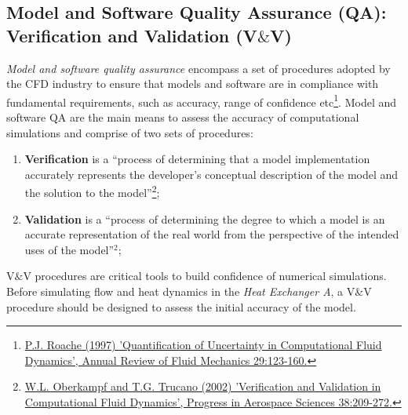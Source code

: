 \documentclass[12pts,a4paper,amsmath,amssymb,floatfix]{article}%
\newcommand{\vv}{V$\&$V }
\begin{document}
     \subsection{Model and Software Quality Assurance (QA): Verification and Validation (V$\&$V)}
                {\it Model and software quality assurance} encompass a set of procedures adopted by the CFD industry to ensure that models and software are in compliance with fundamental requirements, such as accuracy, range of confidence etc\footnote{\href{https://doi.org/10.1146/annurev.fluid.29.1.123}{P.J. Roache (1997) 'Quantification of Uncertainty in Computational Fluid Dynamics', Annual Review of Fluid Mechanics 29:123-160.}}. Model and software QA are the main means to assess the accuracy of computational simulations and comprise of two sets of procedures:
                \begin{enumerate}
                \item {\bf Verification} is a ``process of determining that a model implementation accurately represents the developer's conceptual description of the
model and the solution to the model''\footnote{\href{https://doi.org/10.1016/S0376-0421(02)00005-2}{W.L. Oberkampf and T.G. Trucano (2002) 'Verification and Validation in Computational Fluid Dynamics', Progress in Aerospace Sciences 38:209-272.}};
                   \item {\bf Validation} is a ``process of determining the degree to which a model is an accurate representation of the real world from the perspective of the intended uses of the model''$^{2}$;
                \end{enumerate}
                \vv procedures are critical tools to build confidence of numerical simulations. Before simulating flow and heat dynamics in the {\it Heat Exchanger A}, a \vv procedure should be designed to assess the initial accuracy of the model.
                \medskip
\end{document}
